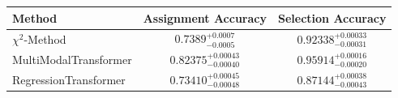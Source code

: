     \begin{tabular}{lcc}
        \toprule
        Method & Assignment Accuracy & Selection Accuracy \\
        \midrule
        $\chi^2$-Method & $0.7389_{-0.0005}^{+0.0007}$ & $0.92338_{-0.00031}^{+0.00033}$ \\
        MultiModalTransformer & $0.82375_{-0.00040}^{+0.00043}$ & $0.95914_{-0.00020}^{+0.00016}$ \\
        RegressionTransformer & $0.73410_{-0.00048}^{+0.00045}$ & $0.87144_{-0.00043}^{+0.00038}$ \\
        \bottomrule
    \end{tabular}